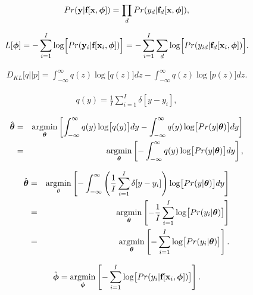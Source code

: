 \documentclass[letterpaper,twoside,openany, titlepage,oldfontcommands,titles,dvipsnames]{memoir}
\begin{document}
\begin{eqnarray}\label{eq:loss_multiple}
 Pr(\mathbf{y}|\mbox{\bf f}[\mathbf{x},\boldsymbol\phi])= \prod_{d}Pr(y_{d}|\mbox{\bf f}_d[\mathbf{x},\boldsymbol\phi]),
 \end{eqnarray}

\begin{eqnarray}
 L[\boldsymbol\phi] = -\sum_{i=1}^{I}\log\Bigl[Pr(\mathbf{y}_i|\mbox{\bf f}[\mathbf{x}_{i},\boldsymbol\phi])\Bigr]= -\sum_{i=1}^{I}\sum_{d}\log\Bigl[Pr(y_{id}|\mbox{\bf f}_d[\mathbf{x}_{i},\boldsymbol\phi])\Bigr].
 \end{eqnarray}

\begin{eqnarray}
 D_{KL}\bigl[q||p\bigr] = \int_{-\infty}^{\infty}q(z) \log\bigl[q(z)\bigr]dz - \int_{-\infty}^{\infty}q(z) \log\bigl[p(z)\bigr]dz.
 \end{eqnarray}

\begin{eqnarray}\label{eq:loss_cross_entropy_empirical}
 q(y) = \frac{1}{I} \sum_{i=1}^{I} \delta[y-y_{i}],
 \end{eqnarray}

\begin{eqnarray}
 \hat{\boldsymbol\theta} &=& \mathop{\rm argmin}_{\boldsymbol\theta}\left[ \int_{-\infty}^{\infty}q(y) \log\bigl[q(y)\bigr]dy - \int_{-\infty}^{\infty}q(y) \log\bigl[Pr(y|\boldsymbol\theta)\bigr] dy\right] \nonumber \\
 &=&\mathop{\rm argmin}_{\boldsymbol\theta}\left[- \int_{-\infty}^{\infty}q(y) \log\bigl[Pr(y|\boldsymbol\theta)\bigr] dy\right],
 \end{eqnarray}

\begin{eqnarray}\label{eq:loss_cross_deriv}
 \hat{\boldsymbol\theta} &=& \mathop{\rm argmin}_{\theta}\left[-\int_{-\infty}^{\infty}\left(\frac{1}{I} \sum_{i=1}^{I} \delta[y-y_{i}]\right)\log\bigl[Pr(y|\boldsymbol\theta)\bigr]dy\right] \nonumber\\
 &=&\mathop{\rm argmin}_{\boldsymbol\theta}\left[-\frac{1}{I} \sum_{i=1}^{I} \log\bigl[Pr(y_i|\boldsymbol\theta)\bigr]\right]\nonumber\\
 &=&\mathop{\rm argmin}_{\boldsymbol\theta}\left[-\sum_{i=1}^{I} \log\bigl[Pr(y_i|\boldsymbol\theta)\bigr]\right].
 \end{eqnarray}

\begin{eqnarray}
 \hat{\boldsymbol\phi} = \mathop{\rm argmin}_{\boldsymbol\phi}\left[-\sum_{i=1}^{I} \log\bigl[Pr(y_{i}|\mbox{\bf f}[\mathbf{x}_{i},\boldsymbol\phi])\bigr]\right].
 \end{eqnarray}
\end{document}
